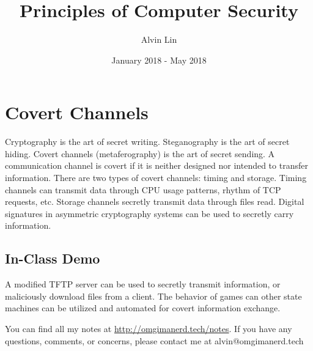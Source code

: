\documentclass{math}
\title{Principles of Computer Security}
\author{Alvin Lin}
\date{January 2018 - May 2018}
\begin{document}
\maketitle

\section*{Covert Channels}
Cryptography is the art of secret writing. Steganography is the art of secret
hiding. Covert channels (metaferography) is the art of secret sending. A
communication channel is covert if it is neither designed nor intended to
transfer information. There are two types of covert channels: timing and
storage. Timing channels can transmit data through CPU usage patterns, rhythm
of TCP requests, etc. Storage channels secretly transmit data through files
read. Digital signatures in asymmetric cryptography systems can be used to
secretly carry information.

\subsection*{In-Class Demo}
A modified TFTP server can be used to secretly transmit information, or
maliciously download files from a client. The behavior of games can other state
machines can be utilized and automated for covert information exchange.

\begin{center}
  You can find all my notes at \url{http://omgimanerd.tech/notes}. If you have
  any questions, comments, or concerns, please contact me at
  alvin@omgimanerd.tech
\end{center}
\end{document}

